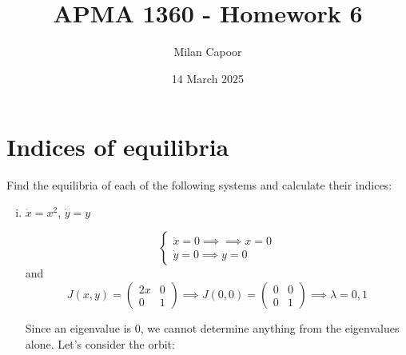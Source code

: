 \documentclass[12pt]{article}
\title{APMA 1360 - Homework 6}
\author{Milan Capoor}
\date{14 March 2025}
\begin{document}
\maketitle

\section{Indices of equilibria}

Find the equilibria of each of the following systems and calculate their indices:
\begin{enumerate}[(i)]
    \item \quad $\dot{x}=x^2$, \quad $\dot{y}=y$

          \color{blue}
          \[\begin{cases}
                  \dot x = 0 \implies \implies x = 0 \\
                  \dot y = 0 \implies y = 0
              \end{cases}\]
          and
          \[J(x, y) = \begin{pmatrix}
                  2x & 0 \\
                  0  & 1
              \end{pmatrix} \implies J(0, 0) = \begin{pmatrix}
                  0 & 0 \\
                  0 & 1
              \end{pmatrix} \implies \lambda = 0, 1\]

          Since an eigenvalue is $0$, we cannot determine anything from the eigenvalues alone. Let's consider the orbit:

          \begin{center}
              \color{black}
\end{center}
\end{enumerate}
\end{document}
